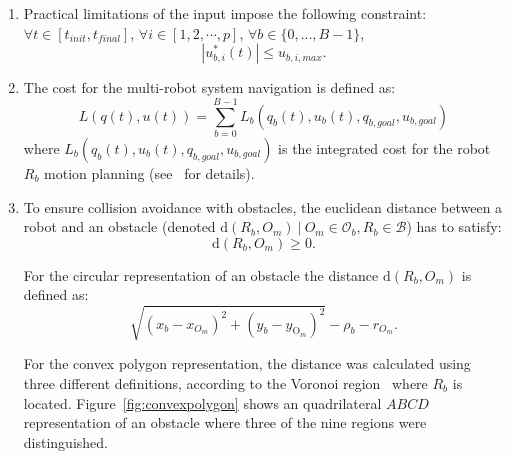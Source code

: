 \begin{enumerate}
    \item Practical limitations of the input impose
    the following constraint: $\forall t \in [t_{init}, t_{final}]$, $\forall i \in [1,2,\cdots, p]$, $\forall b \in \{0,\dots,B-1\}$,
    \begin{equation}
        |u^{*}_{b,i}(t)| \leq u_{b,i,max}.
    \end{equation}
    
    \item The cost for the multi-robot system navigation is defined as:
    \begin{equation}
        L(q(t),u(t)) = \sum_{b=0}^{B-1}L_b(q_b(t), u_b(t), q_{b,goal},u_{b,goal})
    \end{equation}
    where $L_b(q_b(t), u_b(t), q_{b,goal},u_{b,goal})$ is the 
    integrated cost for the robot $R_b$
    motion planning (see~\cite{Defoort2009} for details).
    
    \item 
    To ensure collision avoidance with obstacles, the euclidean 
    distance between
    a robot and an obstacle (denoted $\mathrm{d}(R_b, O_m)\ |\ O_m
    \in \mathcal{O}_b, R_b \in \mathcal{B} $) has to satisfy:
    \begin{equation}
    	\mathrm{d}(R_b, O_m) \geq 0.
    \end{equation}
    
    For the circular representation of an obstacle the distance
    $\mathrm{d}(R_b, O_m)$ is defined as:
    \begin{equation*}
        \sqrt{(x_{b} - x_{O_m})^2 + (y_{b} - y_{\mathrm{O}_m})^2}  - \rho_b - r_{O_m}.
    \end{equation*}
    
    For the convex polygon representation, the distance was calculated
    using three different
    definitions, according to the Voronoi region~\cite{ericson2004real}
    where $R_b$ is located.
    Figure~\ref{fig:convexpolygon} shows an
    quadrilateral $ABCD$ representation of an obstacle where three of the nine
    regions were distinguished. 
    
    

\end{enumerate}
